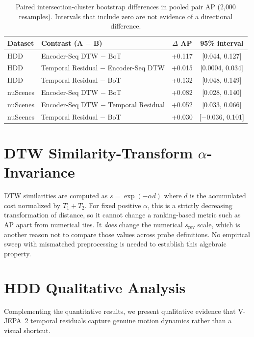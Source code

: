 \documentclass{article}
\theoremstyle{remark}
\begin{document}
\begin{table}[h]
\centering
\caption{Paired intersection-cluster bootstrap differences in pooled pair AP (2{,}000 resamples). Intervals that include zero are not evidence of a directional difference.}
\label{tab:paired_bootstrap}
\begin{tabular}{llcc}
\toprule
\textbf{Dataset} & \textbf{Contrast (A $-$ B)} & \textbf{$\Delta$ AP} & \textbf{95\% interval} \\
\midrule
HDD & Encoder-Seq DTW $-$ BoT & +0.117 & [0.044, 0.127] \\
HDD & Temporal Residual $-$ Encoder-Seq DTW & +0.015 & [0.0004, 0.034] \\
HDD & Temporal Residual $-$ BoT & +0.132 & [0.048, 0.149] \\
\midrule
nuScenes & Encoder-Seq DTW $-$ BoT & +0.082 & [0.028, 0.140] \\
nuScenes & Encoder-Seq DTW $-$ Temporal Residual & +0.052 & [0.033, 0.066] \\
nuScenes & Temporal Residual $-$ BoT & +0.030 & [$-0.036$, 0.101] \\
\bottomrule
\end{tabular}
\end{table}

\section{DTW Similarity-Transform $\alpha$-Invariance}
\label{sec:alpha_sweep}

DTW similarities are computed as $s = \exp(-\alpha d)$ where $d$ is the accumulated cost normalized by $T_1+T_2$. For fixed positive $\alpha$, this is a strictly decreasing transformation of distance, so it cannot change a ranking-based metric such as AP apart from numerical ties. It \emph{does} change the numerical $s_\text{rev}$ scale, which is another reason not to compare those values across probe definitions. No empirical sweep with mismatched preprocessing is needed to establish this algebraic property.

\section{HDD Qualitative Analysis}
\label{sec:hdd_qualitative}

Complementing the quantitative results, we present qualitative evidence that V-JEPA~2 temporal residuals capture genuine motion dynamics rather than a visual shortcut.
\end{document}
